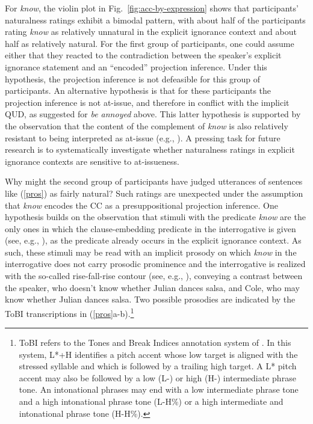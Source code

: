 \documentclass[11pt,fleqn]{article}
\newcommand{\6}{\mbox{$[\hspace*{-.6mm}[$}}
\newcommand{\9}{\mbox{$]\hspace*{-.6mm}]$}}
\begin{document}
For \emph{know}, the violin plot in Fig.~\ref{fig:acc-by-expression} shows that participants' naturalness ratings exhibit a bimodal pattern, with about half of the participants rating \emph{know} as relatively unnatural in the explicit ignorance context and about half as relatively natural. For the first group of participants, one could assume either that they reacted to the contradiction between the speaker's explicit ignorance statement and an ``encoded'' projection inference. Under this hypothesis, the projection inference is not defeasible for this group of participants. An alternative hypothesis is that for these participants the projection inference is not at-issue, and therefore in conflict with the implicit QUD, as suggested for \emph{be annoyed} above. This latter hypothesis is supported by the observation that the content of the complement of \emph{know} is also relatively resistant to being interpreted as at-issue (e.g., \citealt{simons07,tbd-variability,degen-tonhauser-glossa}). A pressing task for future research is to  systematically investigate whether naturalness ratings in explicit ignorance contexts are sensitive to at-issueness.

Why might the second group of participants have judged utterances of sentences like (\ref{pros}) as fairly natural? Such ratings are unexpected under the assumption that \emph{know} encodes the CC as a presuppositional projection inference. One hypothesis builds on the observation that stimuli with the predicate \emph{know} are the only ones in which the clause-embedding predicate in the interrogative is given (see, e.g., \citealt{schwarzschild99}), as the predicate already occurs in the explicit ignorance context. As such, these stimuli may be read with an implicit prosody on which \emph{know} in the interrogative does not carry prosodic prominence and the interrogative is realized with the so-called rise-fall-rise contour (see, e.g., \citealt{ward-hirschberg85,buering97,buering03,wagner-etal2013}), conveying a contrast between the speaker, who doesn't know whether Julian dances salsa, and Cole, who may know whether Julian dances salsa. Two possible prosodies are indicated by the ToBI transcriptions in (\ref{pros}a-b).\footnote{ToBI refers to the Tones and Break Indices annotation system of \citealt{beckman-ayers97}. In this system, L*+H identifies a pitch accent whose low target is aligned with the stressed syllable and which is followed by a trailing high target. A L* pitch accent may also be followed by a low (L-) or high (H-) intermediate phrase tone. An intonational phrases may end with a low intermediate phrase tone and a high intonational phrase tone (L-H\%) or a high intermediate and intonational phrase tone (H-H\%).} 
\end{document}
